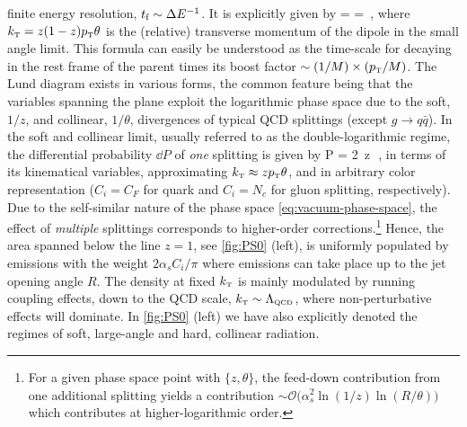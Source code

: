 finite energy resolution,
$t_\text{f} \sim \Delta E^{-1}$. It is explicitly given by
\beq
\label{eq:FormationTime}
\tform =  =  \,,
\eeq
where 
$k_{\text{\tiny T}} = z(1-z) p_{\text{\tiny T}} \theta$ is the (relative) transverse momentum of the dipole in the small angle limit. 
This formula can easily be understood as the time-scale for decaying in the rest frame of the parent times its boost factor $\sim (1/M) \times (p_{\text{\tiny T}}/M)$. 
The Lund diagram exists in various forms, the common feature being that the variables spanning the plane exploit the logarithmic phase space due to the soft, $1/z$, and collinear, $1/\theta$, divergences of typical QCD splittings (except $g \to q\bar q $).
In the soft and collinear limit, usually referred to as the double-logarithmic regime, the differential probability $\dd P$ of 
{\sl one} splitting is given by \cite{Dokshitzer:1991wu,Ellis:1991qj}
\beq
\label{eq:vacuum-phase-space}
\dd P = 2\, \dd \log z\theta \, \dd \log{} \,,
\eeq
in terms of its kinematical variables, approximating $k_{\text{\tiny T}} \approx z p_{\text{\tiny T}} \theta$, and
in arbitrary color representation ($C_i=C_F$ for quark and $C_i = N_c$ for gluon splitting, respectively). Due to the self-similar nature of the phase space \eqref{eq:vacuum-phase-space}, the effect of {\sl multiple} splittings corresponds to higher-order corrections.\footnote{For a given phase space point with $\{z,\theta\}$, the feed-down contribution from one additional splitting yields a contribution $\sim \mathcal{O}\big(\alpha_s^2 \ln (1/z) \ln (R/\theta)\big)$ which contributes at higher-logarithmic order.} Hence, the area spanned below the line $z=1$, see \autoref{fig:PS0} (left), is uniformly populated by emissions with the weight $2\alpha_s C_i/\pi$ where emissions can take place up to the jet opening angle $R$. The density at fixed $k_{\text{\tiny T}}$ is mainly modulated by running coupling effects, down to the QCD scale, $k_{\text{\tiny T}} \sim \Lambda_\text{\tiny  QCD}$, where non-perturbative effects will dominate. 
In \autoref{fig:PS0} (left) we have also explicitly denoted the regimes of soft, large-angle  and hard, collinear radiation. 

